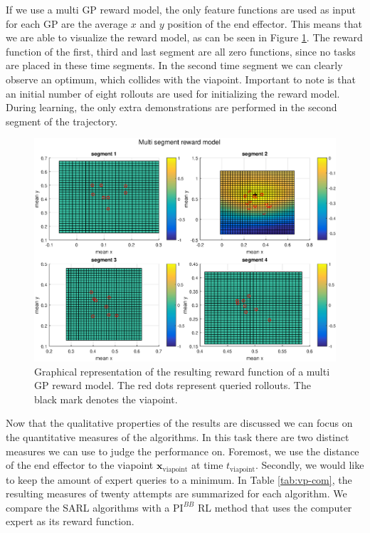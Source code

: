 \documentclass[mscThesis.tex]{subfiles}
\begin{document}
If we use a multi GP reward model, the only feature functions are used as input for each GP are the average $x$ and $y$ position of the end effector. This means that we are able to visualize the reward model, as can be seen in Figure \ref{fig:vp-multi-noise-reward}. The reward function of the first, third and last segment are all zero functions, since no tasks are placed in these time segments. In the second time segment we can clearly observe an optimum, which collides with the viapoint. Important to note is that an initial number of eight rollouts are used for initializing the reward model. During learning, the only extra demonstrations are performed in the second segment of the trajectory.

\begin{figure}[!htb]
\centering
\includegraphics[width=\textwidth, keepaspectratio=1]{figures/results/viapoint/return_flat_multi_noise.eps}
\caption{Graphical representation of the resulting reward function of a multi GP reward model. The red dots represent queried rollouts. The black mark denotes the viapoint.}
\label{fig:vp-multi-noise-reward}
\end{figure}

Now that the qualitative properties of the results are discussed we can focus on the quantitative measures of the algorithms. In this task there are two distinct measures we can use to judge the performance on. Foremost, we use the distance of the end effector to the viapoint $\bm{x}_{\text{viapoint}}$ at time $t_{\text{viapoint}}$. Secondly, we would like to keep the amount of expert queries to a minimum. In Table \ref{tab:vp-com}, the resulting measures of twenty attempts are summarized for each algorithm. We compare the SARL algorithms with a  $\text{PI}^{BB}$ RL method that uses the computer expert as its reward function. 
\end{document}

